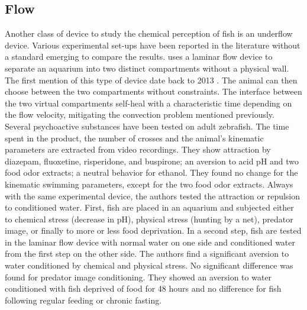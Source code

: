     \subsection{Flow}
    Another class of device to study the chemical perception of fish is an underflow device. Various experimental set-ups have been reported in the literature without a standard emerging to compare the results.
    \cite{abreu2016acute, abreu2016behavioral} uses a laminar flow device to separate an aquarium into two distinct compartments without a physical wall. The first mention of this type of device date back to 2013 \cite{readman2013fish}. The animal can then choose between the two compartments without constraints. The interface between the two virtual compartments self-heal with a characteristic time depending on the flow velocity, mitigating the convection problem mentioned previously. Several psychoactive substances have been tested on adult zebrafish. The time spent in the product, the number of crosses and the animal's kinematic parameters are extracted from video recordings. They show attraction by diazepam, fluoxetine, risperidone, and buspirone; an aversion to acid pH and two food odor extracts; a neutral behavior for ethanol. They found no change for the kinematic swimming parameters, except for the two food odor extracts. Always with the same experimental device, the authors tested the attraction or repulsion to conditioned water. First, fish are placed in an aquarium and subjected either to chemical stress (decrease in pH), physical stress (hunting by a net), predator image, or finally to more or less food deprivation. In a second step, fish are tested in the laminar flow device with normal water on one side and conditioned water from the first step on the other side. The authors find a significant aversion to water conditioned by chemical and physical stress. No significant difference was found for predator image conditioning. They showed an aversion to water conditioned with fish deprived of food for 48 hours and no difference for fish following regular feeding or chronic fasting.

